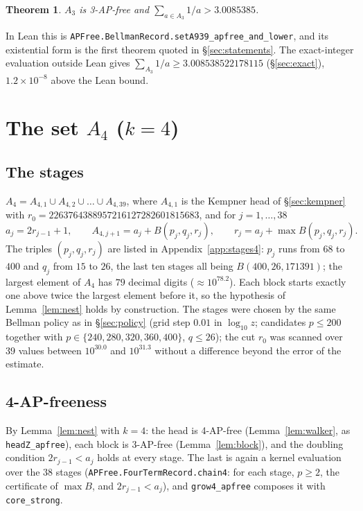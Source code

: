 \documentclass[11pt,a4paper]{article}
\newtheorem{theorem}{Theorem}[section]
\theoremstyle{definition}
\theoremstyle{remark}
\newcommand{\Blk}{B}
\newcommand{\code}[1]{\texttt{#1}}
\begin{document}
\begin{theorem}\label{thm:A3}
$A_3$ is 3-AP-free and $\sum_{a \in A_3} 1/a > 3.0085385$.
\end{theorem}

In Lean this is \code{APFree.\allowbreak{}BellmanRecord.\allowbreak{}setA939\_\allowbreak{}apfree\_\allowbreak{}and\_\allowbreak{}lower}, and its existential form is the first theorem quoted in \S\ref{sec:statements}. The exact-integer evaluation outside Lean gives $\sum_{A_3} 1/a \ge 3.008538522178115$ (\S\ref{sec:exact}), $1.2 \times 10^{-8}$ above the Lean bound.

\section{The set \texorpdfstring{$A_4$}{A4} (\texorpdfstring{$k = 4$}{k = 4})}\label{sec:A4}

\subsection{The stages}\label{sec:stages4}

$A_4 = A_{4,1} \cup A_{4,2} \cup \dots \cup A_{4,39}$, where $A_{4,1}$ is the Kempner head of \S\ref{sec:kempner} with $r_0 = 2263764388957216127282601815683$, and for $j = 1, \dots, 38$
\[
a_j = 2 r_{j-1} + 1,\qquad A_{4,j+1} = a_j + \Blk(p_j,q_j,r_j),\qquad r_j = a_j + \max \Blk(p_j,q_j,r_j).
\]
The triples $(p_j, q_j, r_j)$ are listed in Appendix~\ref{app:stages4}: $p_j$ runs from $68$ to $400$ and $q_j$ from $15$ to $26$, the last ten stages all being $\Blk(400,26,171391)$; the largest element of $A_4$ has $79$ decimal digits ($\approx 10^{78.2}$). Each block starts exactly one above twice the largest element before it, so the hypothesis of Lemma~\ref{lem:nest} holds by construction. The stages were chosen by the same Bellman policy as in \S\ref{sec:policy} (grid step $0.01$ in $\log_{10} z$; candidates $p \le 200$ together with $p \in \{240, 280, 320, 360, 400\}$, $q \le 26$); the cut $r_0$ was scanned over $39$ values between $10^{30.0}$ and $10^{31.3}$ without a difference beyond the error of the estimate.

\subsection{4-AP-freeness}\label{sec:apfree4}

By Lemma~\ref{lem:nest} with $k=4$: the head is 4-AP-free (Lemma~\ref{lem:walker}, as \code{headZ\_\allowbreak{}apfree}), each block is 3-AP-free (Lemma~\ref{lem:block}), and the doubling condition $2 r_{j-1} < a_j$ holds at every stage. The last is again a kernel evaluation over the $38$ stages (\code{APFree.\allowbreak{}FourTermRecord.\allowbreak{}chain4}: for each stage, $p \ge 2$, the certificate of $\max\Blk$, and $2 r_{j-1} < a_j$), and \code{grow4\_\allowbreak{}apfree} composes it with \code{core\_\allowbreak{}strong}.
\end{document}
